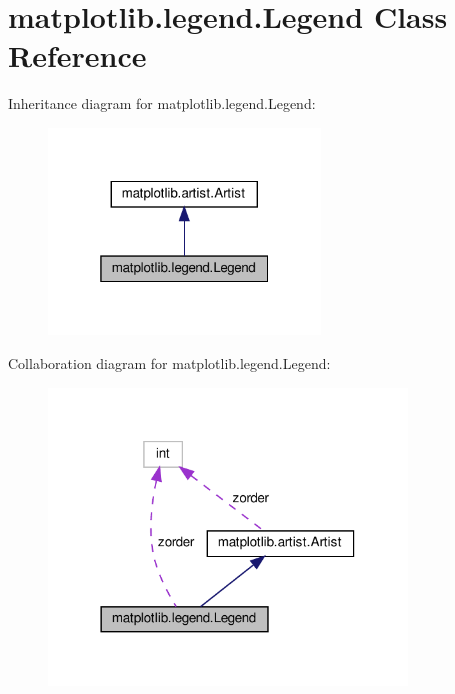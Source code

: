 \hypertarget{classmatplotlib_1_1legend_1_1Legend}{}\section{matplotlib.\+legend.\+Legend Class Reference}
\label{classmatplotlib_1_1legend_1_1Legend}


Inheritance diagram for matplotlib.\+legend.\+Legend\+:
\nopagebreak
\begin{figure}[H]
\begin{center}
\leavevmode
\includegraphics[width=205pt]{classmatplotlib_1_1legend_1_1Legend__inherit__graph}
\end{center}
\end{figure}


Collaboration diagram for matplotlib.\+legend.\+Legend\+:
\nopagebreak
\begin{figure}[H]
\begin{center}
\leavevmode
\includegraphics[width=270pt]{classmatplotlib_1_1legend_1_1Legend__coll__graph}
\end{center}
\end{figure}
